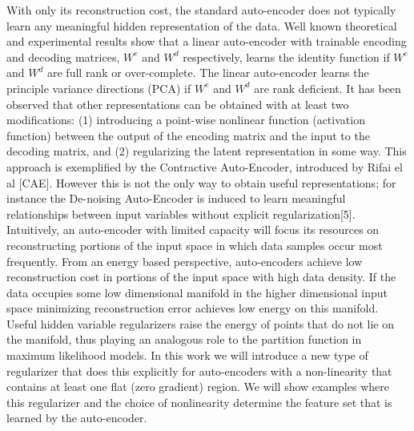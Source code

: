 \documentclass{article} %
\begin{document}
\noindent
With only its reconstruction cost, the standard auto-encoder does not typically learn any meaningful hidden representation of the data. Well known theoretical and experimental results show that a linear auto-encoder with trainable encoding and decoding matrices, $W^e$ and $W^d$ respectively, learns the identity function if $W^e$ and $W^d$ are full rank or over-complete. The linear auto-encoder learns the principle variance directions (PCA) if $W^e$ and $W^d$ are rank deficient. It has been observed that other representations can be obtained with at least two modifications: (1) introducing a point-wise nonlinear function (activation function) between the output of the encoding matrix and the input to the decoding matrix, and (2) regularizing the latent representation in some way. This approach is exemplified by the Contractive Auto-Encoder, introduced by Rifai el al [CAE]. However this is not the only way to obtain useful representations; for instance the De-noising Auto-Encoder is induced to learn meaningful relationships between input variables without explicit regularization[5]. Intuitively, an auto-encoder with limited capacity will focus its resources on reconstructing portions of the input space in which data samples occur most frequently. From an energy based perspective, auto-encoders achieve low reconstruction cost in portions of the input space with high data density. If the data occupies some low dimensional manifold in the higher dimensional input space minimizing reconstruction error achieves low energy on this manifold. Useful hidden variable regularizers raise the energy of points that do not lie on the manifold, thus playing an analogous role to the partition function in maximum likelihood models. In this work we will introduce a new type of regularizer that does this explicitly for auto-encoders with a non-linearity that contains at least one flat (zero gradient) region. We will show examples where this regularizer and the choice of nonlinearity determine the feature set that is learned by the auto-encoder.      
\end{document}
